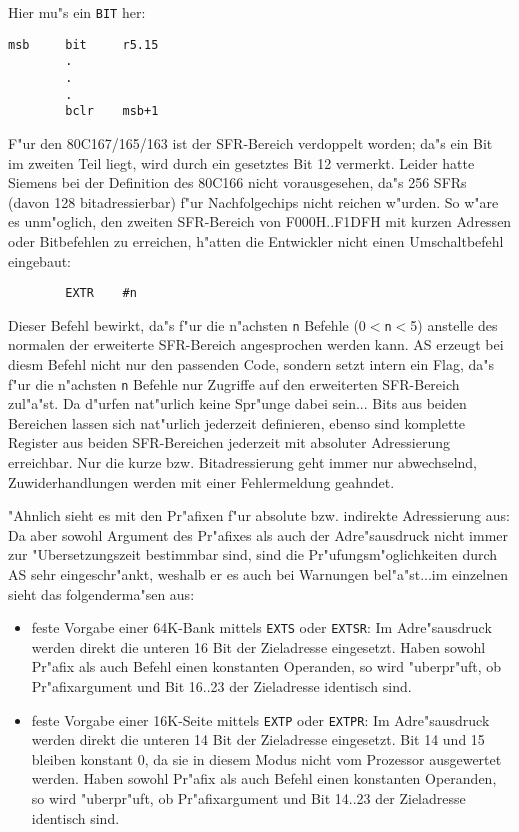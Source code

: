 \documentclass[12pt,a4paper,twoside]{report}
\newcommand{\tty}[1]{{\tt #1}}
\begin{document}
Hier mu"s ein \tty{BIT} her:
\begin{verbatim}
msb     bit     r5.15
        .
        .
        .
        bclr    msb+1
\end{verbatim}
F"ur den 80C167/165/163 ist der SFR-Bereich verdoppelt worden; da"s ein Bit im
zweiten Teil liegt, wird durch ein gesetztes Bit 12 vermerkt.  Leider
hatte Siemens bei der Definition des 80C166 nicht vorausgesehen, da"s
256 SFRs (davon 128 bitadressierbar) f"ur Nachfolgechips nicht reichen
w"urden. So w"are es unm"oglich, den zweiten SFR-Bereich von F000H..F1DFH
mit kurzen Adressen oder Bitbefehlen zu erreichen, h"atten die Entwickler
nicht einen Umschaltbefehl eingebaut:
\begin{verbatim}
        EXTR    #n
\end{verbatim}
Dieser Befehl bewirkt, da"s f"ur die n"achsten \tty{n} Befehle (0$<$\tty{n}$<$5)
anstelle des normalen der erweiterte SFR-Bereich angesprochen werden kann.
AS erzeugt bei diesm Befehl nicht nur den passenden Code, sondern setzt
intern ein Flag, da"s f"ur die n"achsten \tty{n} Befehle nur Zugriffe auf den
erweiterten SFR-Bereich zul"a"st.  Da d"urfen nat"urlich keine Spr"unge
dabei sein... Bits aus beiden Bereichen lassen sich nat"urlich jederzeit
definieren, ebenso sind komplette Register aus beiden SFR-Bereichen
jederzeit mit absoluter Adressierung erreichbar.  Nur die kurze bzw.
Bitadressierung geht immer nur abwechselnd, Zuwiderhandlungen werden
mit einer Fehlermeldung geahndet.
\par
"Ahnlich sieht es mit den Pr"afixen f"ur absolute bzw. indirekte
Adressierung aus: Da aber sowohl Argument des Pr"afixes als auch der
Adre"sausdruck nicht immer zur "Ubersetzungszeit bestimmbar sind, sind
die Pr"ufungsm"oglichkeiten durch AS sehr eingeschr"ankt, weshalb er es
auch bei Warnungen bel"a"st...im einzelnen sieht das folgenderma"sen aus:
\begin{itemize}
\item{feste Vorgabe einer 64K-Bank mittels \tty{EXTS} oder \tty{EXTSR}:
      Im Adre"sausdruck werden direkt die unteren 16 Bit der Zieladresse
      eingesetzt.  Haben sowohl Pr"afix als auch Befehl einen konstanten
      Operanden, so wird "uberpr"uft, ob Pr"afixargument und Bit 16..23 der
      Zieladresse identisch sind.}
\item{feste Vorgabe einer 16K-Seite mittels \tty{EXTP} oder \tty{EXTPR}:
      Im Adre"sausdruck werden direkt die unteren 14 Bit der Zieladresse
      eingesetzt.  Bit 14 und 15 bleiben konstant 0, da sie in diesem Modus
      nicht vom Prozessor ausgewertet werden.  Haben sowohl Pr"afix als
      auch Befehl einen konstanten Operanden, so wird "uberpr"uft, ob
      Pr"afixargument und Bit 14..23 der Zieladresse identisch sind.}
\end{itemize}
\end{document}
